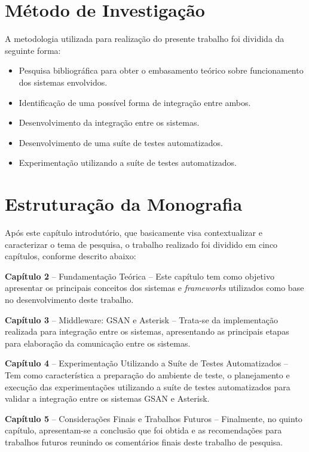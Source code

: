 \section*{Método de Investigação}
A metodologia utilizada para realização do presente trabalho foi dividida da seguinte forma:
\begin{itemize}
	\item Pesquisa bibliográfica para obter o embasamento teórico sobre funcionamento dos sistemas envolvidos.
	\item Identificação de uma possível forma de integração entre ambos.
	\item Desenvolvimento da integração entre os sistemas.
	\item Desenvolvimento de uma suíte de testes automatizados.
	\item Experimentação utilizando a suíte de testes automatizados.
\end{itemize}

\section*{Estruturação da Monografia}
	
Após este capítulo introdutório, que basicamente visa contextualizar e caracterizar o tema de pesquisa, o trabalho realizado foi dividido em cinco capítulos, conforme descrito abaixo:
\begin{description}
	\item \textbf{Capítulo 2 } – Fundamentação Teórica – Este capítulo tem como objetivo apresentar os principais conceitos dos sistemas e \textit{frameworks} utilizados como base no desenvolvimento deste trabalho.
	\item \textbf{Capítulo  3} – Middleware: GSAN e Asterisk – Trata-se da implementação realizada para integração entre os sistemas, apresentando as principais etapas para elaboração da comunicação entre os sistemas.
	\item \textbf{Capítulo  4} – Experimentação Utilizando a Suíte de Testes Automatizados – Tem como característica a preparação do ambiente de teste, o planejamento e execução das experimentações utilizando a suíte de testes automatizados para validar a integração entre os sistemas GSAN e Asterisk.
	\item \textbf{Capítulo 5} – Considerações Finais e Trabalhos Futuros – Finalmente, no quinto capítulo, apresentam-se a conclusão que foi obtida e as recomendações para trabalhos futuros reunindo os comentários finais deste trabalho de pesquisa.	
\end{description}
	

